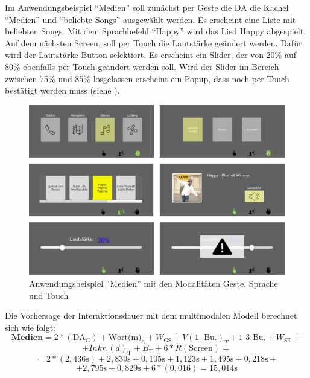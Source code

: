 Im Anwendungsbeispiel "`Medien"' soll zunächst per Geste die DA die Kachel "`Medien"' und "`beliebte Songs"' ausgewählt werden. 
Es erscheint eine Liste mit beliebten Songs. 
Mit dem Sprachbefehl "`Happy"' wird das Lied Happy abgespielt. 
Auf dem nächsten Screen, soll per Touch die Lautstärke geändert werden. 
Dafür wird der Lautstärke Button selektiert. 
Es erscheint ein Slider, der von 20\% auf 80\% ebenfalls per Touch geändert werden soll. 
Wird der Slider im Bereich zwischen 75\% und 85\% losgelassen erscheint ein Popup, dass noch per Touch bestätigt werden muss (siehe ).
\begin{figure}[ht]
	\centering
		\includegraphics[width=1\textwidth]{img/UseCases_Eval_Medien.jpg}
	\caption{Anwendungsbeispiel "`Medien"' mit den Modalitäten Geste, Sprache und Touch}
	\label{fig:UseCasesEvalMedien}
\end{figure}
Die Vorhersage der Interaktionsdauer mit dem multimodalen Modell berechnet sich wie folgt:
\[
\textbf{Medien} = 2*(\text{DA}_\text{G}) + \text{Wort(m)}_\text{S} + W_\text{GS} + V(\text{1. Bu.})_T + \text{1-3 Bu.} + W_\text{ST} + 
\]
\[
 + Inkr.(d)_\text{T} + B_\text{T} + 6*R(\text{Screen}) =
\]
\[
= 2*( 2,436\text{s}) + 2,839\text{s} + 0,105\text{s} + 1,123\text{s} + 1,495\text{s} + 0,218\text{s} +
\]
\[
+2,795\text{s}+0,829\text{s} + 6*(0,016) = 15,014\text{s}
\]

